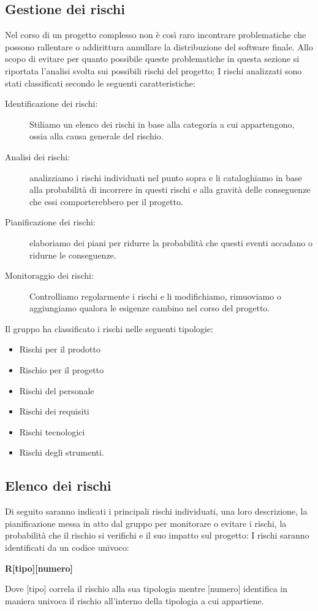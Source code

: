 \documentclass[../piano-di-progetto.tex]{subfiles}
\begin{document}
\subsection{Gestione dei rischi}%
\label{sub:gestione_dei_rischi}
Nel corso di un progetto complesso non è così raro incontrare problematiche che possono rallentare o addirittura annullare la distribuzione del software finale.
Allo scopo di evitare per quanto possibile queste problematiche in questa sezione si riportata l'analisi svolta sui possibili rischi del progetto; I rischi analizzati sono stati classificati secondo le seguenti caratteristiche:
\begin{description}
  \item[Identificazione dei rischi:] Stiliamo un elenco dei rischi in base alla categoria a cui appartengono, ossia alla causa generale del rischio.
  \item[Analisi dei rischi:] analizziamo i rischi individuati nel punto sopra e li cataloghiamo in base alla probabilità di incorrere in questi rischi e alla gravità delle conseguenze che essi comporterebbero per il progetto.
  \item[Pianificazione dei rischi:] elaboriamo dei piani per ridurre la probabilità che questi eventi accadano o ridurne le conseguenze.
  \item[Monitoraggio dei rischi:] Controlliamo regolarmente i rischi e li modifichiamo, rimuoviamo o aggiungiamo qualora le esigenze cambino nel corso del progetto.
\end{description}
Il gruppo ha classificato i rischi nelle seguenti tipologie:
\begin{itemize}
  \item Rischi per il prodotto
  \item Rischio per il progetto
  \item Rischi del personale
  \item Rischi dei requisiti
  \item Rischi tecnologici
  \item Rischi degli strumenti.
\end{itemize}

\subsection{Elenco dei rischi}%
\label{sub:elenco_dei_rischi}
Di seguito saranno indicati i principali rischi individuati, una loro descrizione, la pianificazione messa in atto dal gruppo per monitorare o evitare i rischi, la probabilità che il rischio si verifichi e il suo impatto sul progetto:
I rischi saranno identificati da un codice univoco:
\begin{center}
  \textbf{R[tipo][numero]}
\end{center}
Dove [tipo] correla il rischio alla sua tipologia mentre [numero] identifica in maniera univoca il rischio all'interno della tipologia a cui appartiene.
\end{document}
